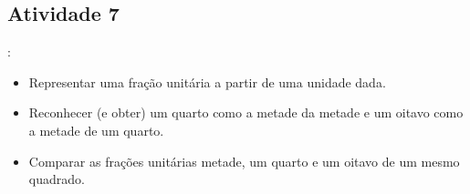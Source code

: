 \pagebreak
\begin{multicols}{2}
\subsection{Atividade 7}

  : \vspace{.1cm}

\begin{itemize} %
    \item       Representar uma fração unitária a partir de uma unidade dada.
    \item       Reconhecer (e obter) um quarto como a metade da metade e um oitavo como a metade de um quarto.
    \item       Comparar as frações unitárias metade, um quarto e um oitavo de um mesmo quadrado.
\end{itemize} %

 \vspace{.1cm}

   \vspace{.1cm}


\end{multicols}
